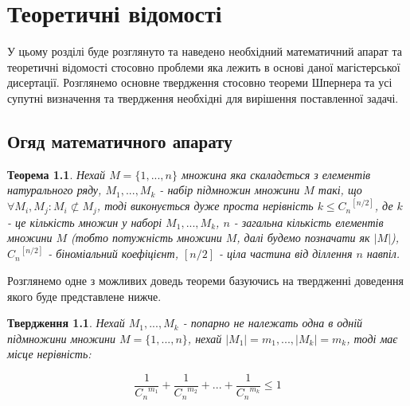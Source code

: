 \chapter{Теоретичні відомості}


У цьому розділі буде розглянуто та наведено необхідний математичний апарат та теоретичні відомості стосовно проблеми яка лежить в основі даної магістерської дисертації. Розглянемо основне твердження стосовно теореми Шпернера та усі супутні визначення та твердження необхідні для вирішення поставленної задачі.


\section{Огяд математичного апарату}
\newtheorem{theorem}{Теорема}
\newtheorem{condition}{Твердження}
\newtheorem{corollary}{Наслідок}
\newtheorem{definition}{Визначення}
\newtheorem{example}{Приклад}
\begin{theorem}
Нехай $ M = \{1,...,n\} $ множина яка скаладється з елементів натурального ряду,
$M_1,...,M_k$ - набір підмножин множини $ M $ такі, що $ \forall M_i,M_j: M_i \not\subset M_j $, 
тоді виконується дуже проста нерівність $k \leq {C_n}^{[n/2]}$, де $ k $ - це кількість множин у наборі $M_1,...,M_k$, $ n $ - загальна кількість елементів множини $ M $ (тобто потужність множини $ M $, далі будемо позначати як $ |M| $), $ {C_n}^{[n/2]} $ - біноміальний коефіцієнт, $ [n/2] $ - ціла частина від діллення $ n $ навпіл. 
\end{theorem}

Розглянемо одне з можливих доведь теореми базуючись на твердженні доведення якого буде представлене нижче.

\begin{condition}
Нехай $ M_1,...,M_k $ - попарно не належать одна в одній підмножини множини $ M = \{1,...,n\} $, нехай $ |M_1| = m_1,...,|M_k| = m_k $, тоді має місце нерівність:
\end{condition}
\begin{large}
\begin{equation} \label{eq:binomial} 
\frac{1}{{C_n}^{m_1}} + \frac{1}{{C_n}^{m_2}} + ... + \frac{1}{{C_n}^{m_k}} \leq 1
\end{equation}
\end{large}
\newline


